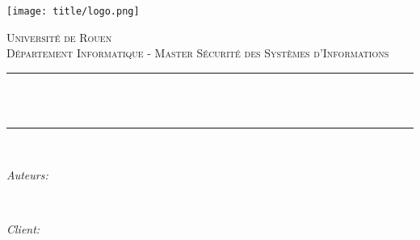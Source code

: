 \begin{titlepage}

\newcommand{\HRule}{\rule{\linewidth}{0.5mm}} %


\texttt{[image: title/logo.png]}\\[1cm] %
 

\center %


\textsc{\Large Université de Rouen}\\[0.5cm] %
\textsc{\large Département Informatique - Master Sécurité des Systèmes d'Informations}\\[0.5cm] %

\makeatletter
\HRule \\[0.4cm]
{ \huge \bfseries \@title}\\[0.4cm] %
\HRule \\[1.5cm]
 

\begin{minipage}{0.4\textwidth}
\begin{flushleft} \large
\emph{Auteurs:}\\
\@author %
\end{flushleft}
\end{minipage}
~
\begin{minipage}{0.4\textwidth}
\begin{flushright} \large
\emph{Client:} \\
\client %
\end{flushright}
\end{minipage}\\[6cm]
\makeatother


\end{titlepage}
